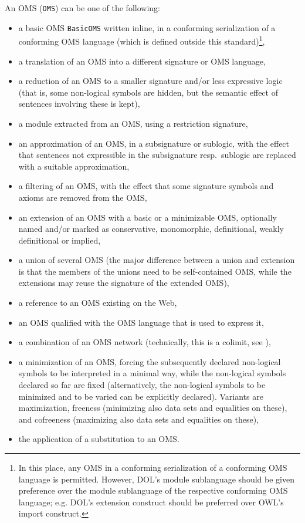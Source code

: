 \documentclass[10pt,fleqn,%
\ifpretendfinal
final%
\else
draft%
\fi,
]{scrreprt}
\makeatletter
\newcommand{\red}[1]{#1} %
\newcommand*{\eg}{e.g.\@\xspace}
\newcommand*{\syntax}[1]{\texttt{#1}}
\makeatother
\begin{document}
An OMS (\syntax{OMS}) can be one of the following:
\begin{itemize}
\item a basic OMS \syntax{BasicOMS} written inline, in a conforming serialization of a conforming OMS 
language (which is defined outside this standard)\footnote{In this place, any OMS in a conforming serialization of a conforming OMS language is permitted.  
However, DOL's module sublanguage should be given preference over the module sublanguage of 
the respective conforming OMS language; \eg DOL's extension construct should be preferred over OWL's import construct.},
\item a translation of an OMS into a different signature or OMS
language,
\item a reduction of an OMS to a smaller signature and/or less
expressive logic (that is,
some non-logical symbols are hidden, but the semantic effect of sentences involving these is kept),
\item a module extracted from an OMS, using a restriction signature,
\item an approximation of an OMS, in a subsignature or sublogic, with the effect that sentences not expressible in the subsignature resp.\ sublogic are replaced with a suitable approximation,
\item \red{a filtering of an OMS, with the effect that some signature symbols and axioms are removed from the OMS,}
\item an extension of an OMS with a basic or a minimizable OMS, optionally named and/or marked as conservative, monomorphic, definitional, weakly definitional or implied,
\item a union of several OMS (the major difference between a union and extension is that the members of the unions need to be self-contained OMS, while the extensions may reuse the signature of the extended OMS), 
\item a reference to an OMS existing on the Web,
\item an OMS qualified with the OMS language that is used to express it,
\item a combination of an OMS network (technically, this is a colimit, see \cite{ZimmermanEtAl06}),
\item a minimization of an OMS, forcing the subsequently declared
  non-logical symbols to be interpreted in a minimal way, while the non-logical symbols declared so far are fixed (alternatively, the non-logical symbols to be minimized and to be varied can be explicitly declared). \red{Variants are
maximization, freeness (minimizing also data sets and equalities on these), and cofreeness
(maximizing also data sets and equalities on these),}
\item \red{the application of a substitution to an OMS.}


\end{itemize}
\end{document}
